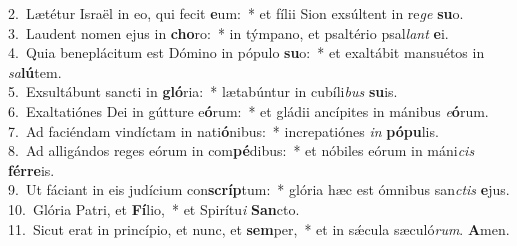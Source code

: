 {2.~}Lætétur Israël in eo, qui fecit \textbf{e}um:~* et fílii Sion exsúltent in re\textit{ge} \textbf{su}o.\\
{3.~}Laudent nomen ejus in \textbf{cho}ro:~* in týmpano, et psaltério psal\textit{lant} \textbf{e}i.\\
{4.~}Quia beneplácitum est Dómino in pópulo \textbf{su}o:~* et exaltábit mansuétos in \textit{sa}\textbf{lú}tem.\\
{5.~}Exsultábunt sancti in \textbf{gló}ria:~* lætabúntur in cubíli\textit{bus} \textbf{su}is.\\
{6.~}Exaltatiónes Dei in gútture e\textbf{ó}rum:~* et gládii ancípites in mánibus \textit{e}\textbf{ó}rum.\\
{7.~}Ad faciéndam vindíctam in nati\textbf{ó}nibus:~* increpatiónes \textit{in} \textbf{pó}\textbf{pu}lis.\\
{8.~}Ad alligándos reges eórum in com\textbf{pé}dibus:~* et nóbiles eórum in máni\textit{cis} \textbf{fér}\textbf{re}is.\\
{9.~}Ut fáciant in eis judícium con\textbf{scríp}tum:~* glória hæc est ómnibus san\textit{ctis} \textbf{e}jus.\\
{10.~}Glória Patri, et \textbf{Fí}lio,~* et Spirítu\textit{i} \textbf{San}cto.\\
{11.~}Sicut erat in princípio, et nunc, et \textbf{sem}per,~* et in sǽcula sæculó\textit{rum}. \textbf{A}men.\\
